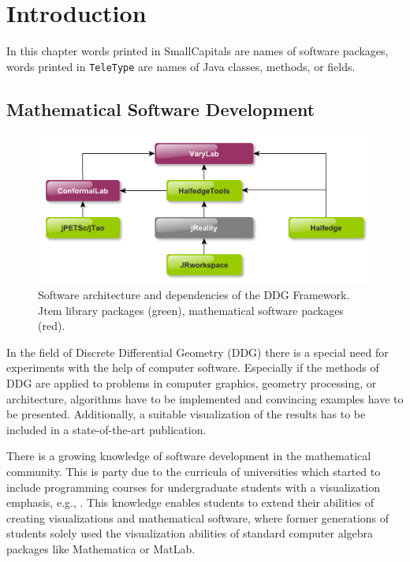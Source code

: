 \documentclass[Thesis.tex]{subfiles}
\begin{document}
\chapter{Introduction}

In this chapter words printed in {\sc SmallCapitals} are names of software packages, words printed
in {\tt TeleType} are names of {\sc Java} classes, methods, or fields.

\section{Mathematical Software Development}

\begin{figure}[h]
	\centering
	\includegraphics[width=\linewidth]{figures/software_architecture}
	\caption[Software package dependencies]{
		Software architecture and dependencies of the DDG Framework. 
		{\sc Jtem} library packages (green), mathematical software packages (red).
	}
	\label{fig:software_architecture}
\end{figure}

In the field of Discrete Differential Geometry (DDG) there is a special need for experiments
with the help of computer software. Especially if the methods of DDG are applied
to problems in computer graphics, geometry processing, or architecture, algorithms have 
to be implemented and convincing examples have to be presented. Additionally, a suitable 
visualization of the results has to be included in a state-of-the-art publication.

There is a growing knowledge of software development in the mathematical community. This 
is party due to the curricula of universities which started to include programming courses for 
undergraduate students with a visualization emphasis, e.g., \cite{VisMathHomepage, 
CaltechVisMath}. This knowledge enables students to extend their abilities of creating visualizations and 
mathematical software, where former generations of students solely used the visualization 
abilities of standard computer algebra packages like Mathematica or MatLab.
\end{document}
